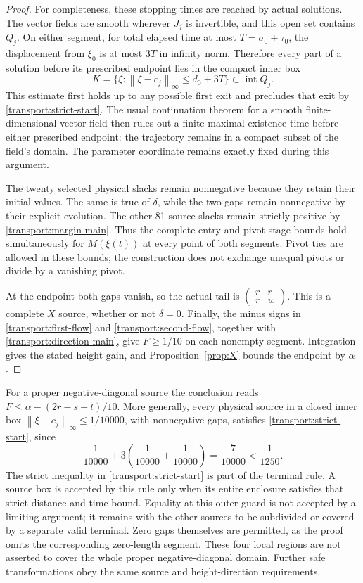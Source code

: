\documentclass[11pt,reqno]{amsart}
\theoremstyle{definition}
\theoremstyle{remark}
\newcommand{\iin}[1]{\left\|#1\right\|_\infty}
\begin{document}
\begin{proof}
For completeness, these stopping times are reached by actual solutions.
The vector fields are smooth wherever \(J_j\) is invertible, and this
open set contains \(Q_j\).  On either segment, for total elapsed time
at most \(T=\sigma_0+\tau_0\), the displacement from \(\xi_0\)
is at most \(3T\) in infinity norm.  Therefore every part of a
solution before its prescribed endpoint lies in the compact inner box
\[
K=\{\xi:\iin{\xi-c_j}\le d_0+3T\}\subset\operatorname{int}Q_j.
\]
This estimate first holds up to any possible first exit and precludes
that exit by \eqref{transport:strict-start}.  The usual continuation
theorem for a smooth finite-dimensional vector field then rules out a
finite maximal existence time before either prescribed endpoint:
the trajectory remains in a compact subset of the field's domain.
The parameter coordinate remains exactly fixed during this argument.

The twenty selected physical slacks remain nonnegative because they
retain their initial values.  The same is true of \(\delta\), while
the two gaps remain nonnegative by their explicit evolution.  The
other 81 source slacks remain strictly positive by
\eqref{transport:margin-main}.  Thus the complete entry and pivot-stage
bounds hold simultaneously for \(M(\xi(t))\) at every point of both
segments.  Pivot ties are allowed in these bounds; the construction
does not exchange unequal pivots or divide by a vanishing pivot.

At the endpoint both gaps vanish, so the actual tail is
\(\left(\begin{smallmatrix}r&r\\r&w\end{smallmatrix}\right)\).
This is a complete \(X\) source, whether or not \(\delta=0\).
Finally, the minus signs in \eqref{transport:first-flow} and
\eqref{transport:second-flow}, together with
\eqref{transport:direction-main}, give \(\dot F\ge1/10\) on each
nonempty segment.  Integration gives the stated height gain, and
Proposition~\ref{prop:X} bounds the endpoint by \(\alpha\).
\end{proof}

For a proper negative-diagonal source the conclusion reads
\(F\le\alpha-(2r-s-t)/10\).  More generally, every physical source
in a closed inner box \(\iin{\xi-c_j}\le1/10000\), with nonnegative
gaps, satisfies \eqref{transport:strict-start}, since
\[
\frac1{10000}+3\left(\frac1{10000}+\frac1{10000}\right)
=\frac7{10000}<\frac1{1250}.
\]
The strict inequality in \eqref{transport:strict-start} is part of the
terminal rule.  A source box is accepted by this rule only when its
entire enclosure satisfies that strict distance-and-time bound.
Equality at this outer guard is not accepted by a limiting argument;
it remains with the other sources to be subdivided or covered by a
separate valid terminal.  Zero gaps themselves are permitted, as the
proof omits the corresponding zero-length segment.  These four local
regions are not asserted to cover the whole proper negative-diagonal
domain.  Further safe transformations obey the same source and
height-direction requirements.
\end{document}

